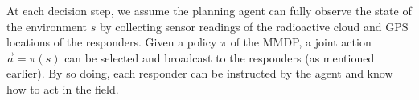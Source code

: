 At each decision step, we assume the planning agent can fully
observe the state of the environment $s$ by collecting sensor
readings of the radioactive cloud and GPS locations of the
responders. Given a policy $\pi$ of the MMDP, a joint action
$\vec{a}=\pi(s)$ can be selected and broadcast to the responders
(as mentioned earlier). By so doing, each responder can be
instructed by the agent and know how to act in the field.
